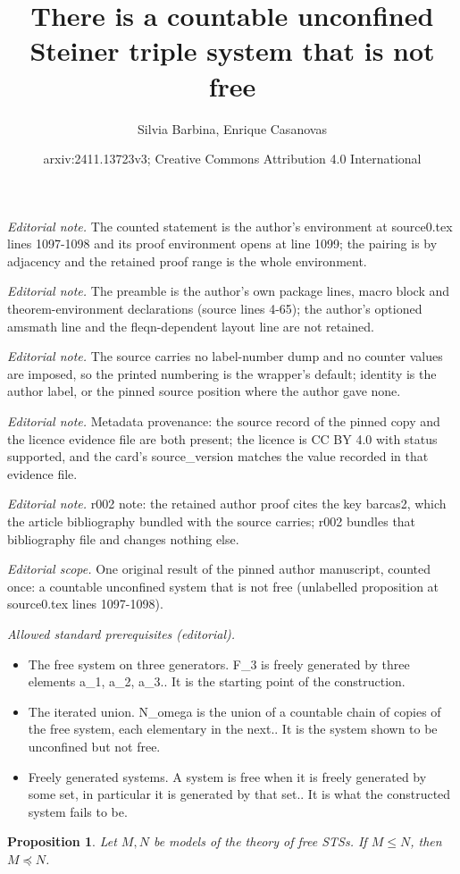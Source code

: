 \documentclass[10pt,a4paper]{article}
\title{There is a countable unconfined Steiner triple system that is not free}
\author{Silvia Barbina, Enrique Casanovas}
\date{arxiv:2411.13723v3; Creative Commons Attribution 4.0 International}
\theoremstyle{note}
\newtheorem{prop}[thm]{Proposition}
\begin{document}
\maketitle
\noindent\textit{Editorial note.} The counted statement is the author's environment at source0.tex lines 1097-1098 and its proof environment opens at line 1099; the pairing is by adjacency and the retained proof range is the whole environment.\par\medskip
\noindent\textit{Editorial note.} The preamble is the author's own package lines, macro block and theorem-environment declarations (source lines 4-65); the author's optioned amsmath line and the fleqn-dependent layout line are not retained.\par\medskip
\noindent\textit{Editorial note.} The source carries no label-number dump and no counter values are imposed, so the printed numbering is the wrapper's default; identity is the author label, or the pinned source position where the author gave none.\par\medskip
\noindent\textit{Editorial note.} Metadata provenance: the source record of the pinned copy and the licence evidence file are both present; the licence is CC BY 4.0 with status supported, and the card's source\_version matches the value recorded in that evidence file.\par\medskip
\noindent\textit{Editorial note.} r002 note: the retained author proof cites the key barcas2, which the article bibliography bundled with the source carries; r002 bundles that bibliography file and changes nothing else.\par\medskip
\noindent\textit{Editorial scope.} One original result of the pinned author manuscript, counted once: a countable unconfined system that is not free (unlabelled proposition at source0.tex lines 1097-1098).\par\medskip
\noindent\textit{Allowed standard prerequisites (editorial).}\begin{itemize}
\item The free system on three generators. F\_3 is freely generated by three elements a\_1, a\_2, a\_3.. It is the starting point of the construction.
\item The iterated union. N\_omega is the union of a countable chain of copies of the free system, each elementary in the next.. It is the system shown to be unconfined but not free.
\item Freely generated systems. A system is free when it is freely generated by some set, in particular it is generated by that set.. It is what the constructed system fails to be.
\end{itemize}\medskip
	\begin{prop}\label{April_11_2024_6}
		Let $M,N$ be models of the theory of free STSs. If $M\leq N$, then  $M\preccurlyeq N$.
	\end{prop}
\end{document}
